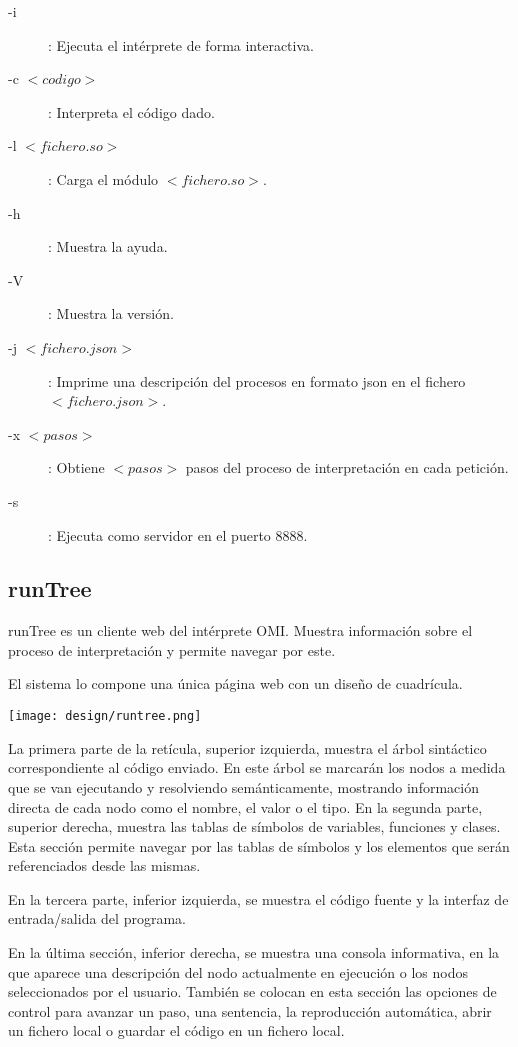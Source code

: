 \begin{description}
\item[-i	]:	Ejecuta el intérprete de forma interactiva.
 \item [-c $<codigo>$]:	Interpreta el código dado.
 \item [-l $<fichero.so>$]: Carga el módulo $<fichero.so>$.
\item [-h]: Muestra la ayuda.
 \item[-V]: Muestra la versión.
\item [-j $<fichero.json>$]: Imprime una descripción del procesos en formato json en el fichero $<fichero.json>$.
  \item [-x $<pasos>$]: Obtiene $<pasos>$ pasos del proceso de interpretación en cada petición. 
 \item [-s]:	Ejecuta como servidor en el puerto 8888.
\end {description}

\subsection{runTree}

runTree es un cliente web del intérprete OMI. Muestra información sobre el proceso de interpretación y permite navegar por este. 

El sistema lo compone una única página web con un diseño de cuadrícula.

\begin{center}
\texttt{[image: design/runtree.png]} 
\end{center}

La primera parte de la retícula, superior izquierda, muestra el árbol sintáctico correspondiente al código enviado. En este árbol se marcarán los nodos a medida 
que se van ejecutando y resolviendo semánticamente, mostrando información directa de cada nodo como el nombre, el valor o el tipo.
En la segunda parte, superior derecha, muestra las tablas de símbolos de variables, funciones y clases. Esta sección permite navegar por las tablas de símbolos 
y los elementos que serán referenciados desde las mismas.

En la tercera parte, inferior izquierda, se muestra el código fuente y la interfaz de entrada/salida del programa.

En la última sección, inferior derecha, se muestra una consola informativa, en la que aparece una descripción del nodo actualmente en ejecución o 
los nodos seleccionados por el usuario. También se colocan en esta sección las opciones de control para avanzar un paso, una sentencia, la reproducción automática, abrir un fichero local o guardar el 
código en un fichero local. 

